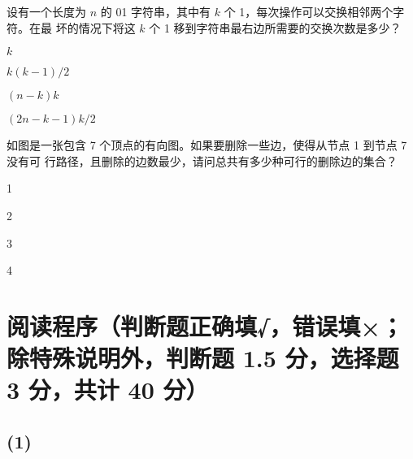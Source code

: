 \documentclass{exam-zh}
\begin{document}
\begin{question}
    设有一个长度为 $n$ 的 01 字符串，其中有 $k$ 个 1，每次操作可以交换相邻两个字符。在最
    坏的情况下将这 $k$ 个 1 移到字符串最右边所需要的交换次数是多少？\paren[C]

\begin{choices}
    \item  $k$
    \item  $k(k-1)/2$
    \item  $(n-k)k$
    \item  $(2n-k-1)k/2$
\end{choices}
\end{question}

\begin{solution}

\end{solution}
    
    
\begin{question}
    如图是一张包含 7 个顶点的有向图。如果要删除一些边，使得从节点 1 到节点 7 没有可
    行路径，且删除的边数最少，请问总共有多少种可行的删除边的集合？\paren[D]
    

    \begin{choices}
        \item 1
        \item 2
        \item 3
        \item 4
    \end{choices}
\end{question}

\begin{solution}

\end{solution}

\newpage

\section{阅读程序（判断题正确填√，错误填×；除特殊说明外，判断题 1.5 分，选择题 3 分，共计 40 分）}

\subsection*{(1)} %
\end{document}
